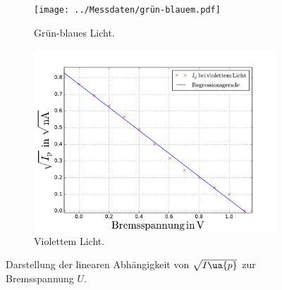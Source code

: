 \begin{figure}
  \centering
  \begin{subfigure}{0.48\textwidth}
    \centering
    \texttt{[image: ../Messdaten/grün-blauem.pdf]}
    \caption{Grün-blaues Licht.}
    \label{fig: grün-blau}
  \end{subfigure}
  \begin{subfigure}{0.48\textwidth}
    \centering
    \includegraphics[width=1 \textwidth]{../Messdaten/violettem.pdf} %
    \caption{Violettem Licht.}
    \label{fig: violett}
  \end{subfigure}
  \caption{Darstellung der linearen Abhängigkeit von $\sqrt{I\ua{p}}$ zur Bremsspannung $U$.}
  \label{fig: darstellung_2}
\end{figure}
